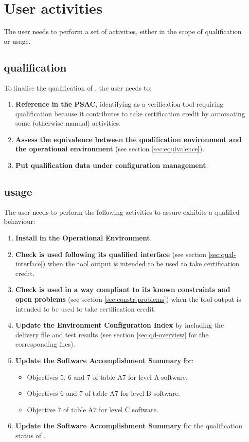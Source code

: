 \documentclass {report}
\begin{document}
\chapter{User activities}
\label{sec:user-act}
The user needs to perform a set of activities, either in the scope of \xcov qualification or \xcov usage.

\section{\xcov qualification}
To finalise the qualification of \xcov, the user needs to:
\begin{enumerate}
\item \textbf{Reference \xcov in the PSAC}, identifying \xcov as a verification tool requiring qualification because it contributes to take certification credit by automating some (otherwise manual) activities.
\item \textbf{Assess the equivalence between the qualification environment and the operational environment} (see section \ref{sec:equivalence}).
\item \textbf{Put qualification data under configuration management}.
\end{enumerate}

\section{\xcov usage}
The user needs to perform the following activities to assure \xcov exhibits a qualified behaviour:
\begin{enumerate}
\item \textbf{Install \xcov in the Operational Environment}.
\item \textbf{Check \xcov is used following its qualified interface} (see section \ref{sec:qual-interface}) when the tool output is intended to be used to take certification credit.
\item \textbf{Check \xcov is used in a way compliant to its known constraints and open problems} (see section \ref{sec:constr-problems}) when the tool output is intended to be used to take certification credit.
\item \textbf{Update the Environment Configuration Index} by including the delivery file and test results (see section \ref{sec:qd-overview} for the corresponding files).
\item \textbf{Update the Software Accomplishment Summary} for:
\begin{itemize}
\item Objectives 5, 6 and 7 of table A7 for level A software.
\item Objectives 6 and 7 of table A7 for level B software.
\item Objective 7 of table A7 for level C software.
\end{itemize}
\item \textbf{Update the Software Accomplishment Summary} for the qualification status of \xcov.
\end{enumerate}
\end{document}
